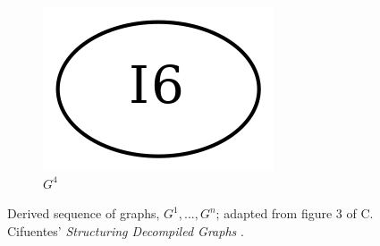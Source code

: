 \begin{figure}[htbp]
\begin{subfigure}[b]{0.08\textwidth}
		\includegraphics[width=\textwidth]{inc/3_background/interval_method/derived_sequence_of_graphs/G_4.png}
		\vspace{2em}
		\caption{$G^4$}
	\end{subfigure}
	\caption{Derived sequence of graphs, $G^1, ..., G^n$; adapted from figure 3 of C. Cifuentes' \textit{Structuring Decompiled Graphs} \cite{structuring_decompiled_graphs}.}
	\label{fig:derived_sequence_of_graphs}
\end{figure}






